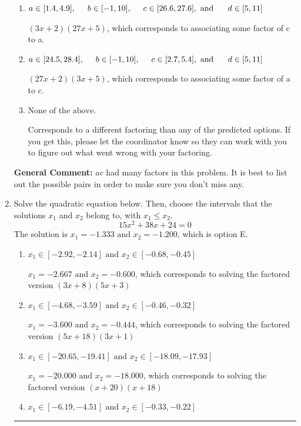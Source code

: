 \documentclass{extbook}[14pt]
\newcommand{\litem}[1]{\item #1

\rule{\textwidth}{0.4pt}}
\begin{document}
\begin{enumerate}
{\begin{enumerate}[label=\Alph*.]
* $(9x + 2)(9x + 5)$, which is the correct option.
\item \( a \in [1.4, 4.9], \hspace*{5mm} b \in [-1, 10], \hspace*{5mm} c \in [26.6, 27.6], \text{ and } \hspace*{5mm} d \in [5, 11] \)

 $(3x + 2)(27x + 5)$, which corresponds to associating some factor of c to a.
\item \( a \in [24.5, 28.4], \hspace*{5mm} b \in [-1, 10], \hspace*{5mm} c \in [2.7, 5.4], \text{ and } \hspace*{5mm} d \in [5, 11] \)

 $(27x + 2)(3x + 5)$, which corresponds to associating some factor of a to c.
\item \( \text{None of the above.} \)

 Corresponds to a different factoring than any of the predicted options. If you get this, please let the coordinator know so they can work with you to figure out what went wrong with your factoring.
\end{enumerate}

\textbf{General Comment:} $ac$ had many factors in this problem. It is best to list out the possible pairs in order to make sure you don't miss any.
}
\litem{
Solve the quadratic equation below. Then, choose the intervals that the solutions $x_1$ and $x_2$ belong to, with $x_1 \leq x_2$.
\[ 15x^{2} +38 x + 24 = 0 \]The solution is \( x_1 = -1.333 \text{ and } x_2 = -1.200 \), which is option E.\begin{enumerate}[label=\Alph*.]
\item \( x_1 \in [-2.92, -2.14] \text{ and } x_2 \in [-0.68, -0.45] \)

$x_1 = -2.667 \text{ and } x_2 = -0.600$, which corresponds to solving the factored version $(3x + 8)(5x + 3)$
\item \( x_1 \in [-4.68, -3.59] \text{ and } x_2 \in [-0.46, -0.32] \)

$x_1 = -3.600 \text{ and } x_2 = -0.444$, which corresponds to solving the factored version $(5x + 18)(3x + 1)$
\item \( x_1 \in [-20.65, -19.41] \text{ and } x_2 \in [-18.09, -17.93] \)

$x_1 = -20.000 \text{ and } x_2 = -18.000$, which corresponds to solving the factored version $(x + 20)(x + 18)$
\item \( x_1 \in [-6.19, -4.51] \text{ and } x_2 \in [-0.33, -0.22] \)


\end{enumerate}}
\end{enumerate}
\end{document}
